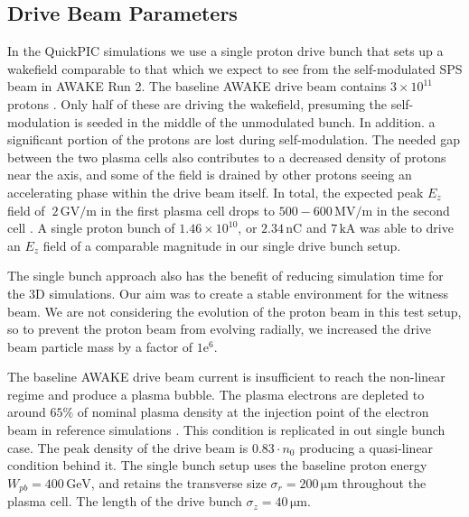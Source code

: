 \documentclass[aps,prstab,reprint,amsmath,amssymb,groupedaddress]{revtex4-1}
\newcommand{\unit}[1]{\,\mathrm{#1}}
\newcommand{\funit}[2]{\,\mathrm{#1}/\mathrm{#2}}
\newcommand{\mexp}[1]{\mathrm{e}^{#1}}
\newcommand{\nexp}[1]{\times 10^{#1}}
\begin{document}
\subsection[\label{S:M:Setup}]{Drive Beam Parameters}

In the QuickPIC simulations we use a single proton drive bunch that sets up a wakefield comparable to that which we
expect to see from the self-modulated SPS beam in AWAKE Run 2. The baseline AWAKE drive beam contains $3\nexp{11}$
protons \cite{gschwendtner:2016}. Only half of these are driving the wakefield, presuming the self-modulation is seeded
in the middle of the unmodulated bunch. In addition. a significant portion of the protons are lost during
self-modulation. The needed gap between the two plasma cells also contributes to a decreased density of protons near the
axis, and some of the field is drained by other protons seeing an accelerating phase within the drive beam itself. In
total, the expected peak $E_{z}$ field of $~2\funit{GV}{m}$ in the first plasma cell drops to $500-600\funit{MV}{m}$ in
the second cell \cite{awake_collaboration:2016}. A single proton bunch of $1.46\nexp{10}$, or $2.34\unit{nC}$ and
$7\unit{kA}$ was able to drive an $E_{z}$ field of a comparable magnitude in our single drive bunch setup.

The single bunch approach also has the benefit of reducing simulation time for the 3D simulations. Our aim was to create
a stable environment for the witness beam. We are not considering the evolution of the proton beam in this test setup,
so to prevent the proton beam from evolving radially, we increased the drive beam particle mass by a factor of
$1\mexp{6}$.

The baseline AWAKE drive beam current is insufficient to reach the non-linear regime and produce a plasma bubble. The
plasma electrons are depleted to around $65\%$ of nominal plasma density at the injection point of the electron beam in
reference simulations \cite{awake_collaboration:2016}. This condition is replicated in out single bunch case. The peak
density of the drive beam is $0.83\cdot n_{0}$ producing a quasi-linear condition behind it. The single bunch setup uses
the baseline proton energy $W_{pb} = 400\unit{GeV}$, and retains the transverse size $\sigma_{r} = 200\unit{\mu m}$
throughout the plasma cell. The length of the drive bunch $\sigma_{z} = 40\unit{\mu m}$.
\end{document}
